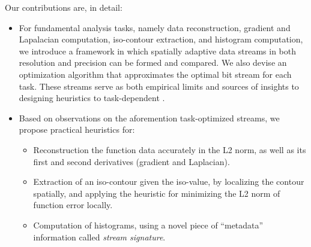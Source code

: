 Our contributions are, in detail:

\begin{itemize}
  \item For fundamental analysis tasks, namely data reconstruction, gradient and Lapalacian computation, iso-contour extraction, and histogram computation, we introduce a framework in which spatially adaptive data streams in both resolution and precision can be formed and compared. We also devise an optimization algorithm that approximates the optimal bit stream for each task. These streams serve as both empirical limits and sources of insights to designing heuristics to task-dependent .
  \item Based on observations on the aforemention task-optimized streams, we propose practical heuristics for:
  \begin{itemize}
    \item Reconstruction the function data accurately in the L2 norm, as well as its first and second derivatives (gradient and Laplacian).
    \item Extraction of an iso-contour given the iso-value, by localizing the contour spatially, and applying the heuristic for minimizing the L2 norm of function error locally.
    \item Computation of histograms, using a novel piece of ``metadata'' information called \emph{stream signature}.
  \end{itemize}
\end{itemize}


